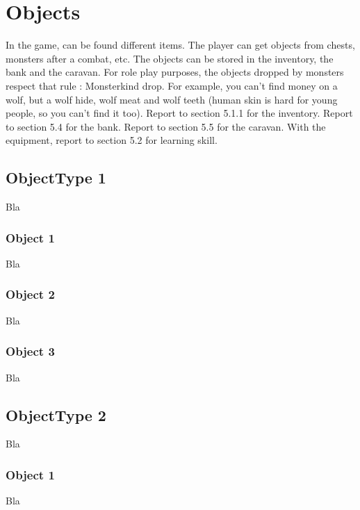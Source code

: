 \documentclass[a4paper,12pt]{book}
\begin{document}
\section{Objects}
In the game, can be found different items. The player can get objects from chests, monsters after a combat, etc. The objects can be stored in the inventory, the bank and the caravan.
For role play purposes, the objects dropped by monsters respect that rule : Monsterkind drop. For example, you can't find money on a wolf, but a wolf hide, wolf meat and wolf teeth (human skin is hard for young people, so you can't find it too).
Report to section 5.1.1 for the inventory.
Report to section 5.4 for the bank.
Report to section 5.5 for the caravan.
With the equipment, report to section 5.2 for learning skill.
\subsection{ObjectType 1}
Bla
\subsubsection{Object 1}
Bla
\subsubsection{Object 2}
Bla
\subsubsection{Object 3}
Bla
\subsection{ObjectType 2}
Bla
\subsubsection{Object 1}
Bla
\end{document}
